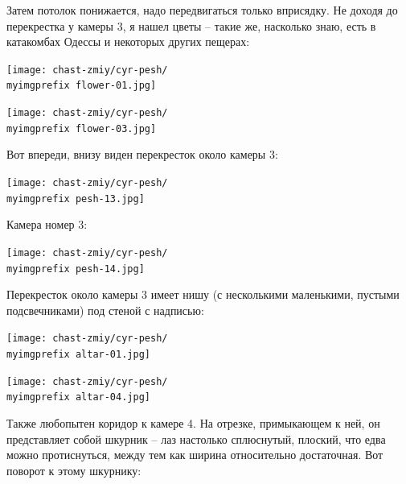 \newpage

Затем потолок понижается, надо передвигаться только вприсядку. Не доходя до перекрестка у камеры 3, я нашел цветы – такие же, насколько знаю, есть в катакомбах Одессы и некоторых других пещерах:

\begin{center}
\texttt{[image: chast-zmiy/cyr-pesh/\\myimgprefix flower-01.jpg]}
\end{center}

\begin{center}
\texttt{[image: chast-zmiy/cyr-pesh/\\myimgprefix flower-03.jpg]}
\end{center}
   
\newpage

Вот впереди, внизу виден перекресток около камеры 3:

\begin{center}
\texttt{[image: chast-zmiy/cyr-pesh/\\myimgprefix pesh-13.jpg]}
\end{center}

Камера номер 3:

\begin{center}
\texttt{[image: chast-zmiy/cyr-pesh/\\myimgprefix pesh-14.jpg]}
\end{center}

\newpage

Перекресток около камеры 3 имеет нишу (с несколькими маленькими, пустыми подсвечниками) под стеной с надписью:

\begin{center}
\texttt{[image: chast-zmiy/cyr-pesh/\\myimgprefix altar-01.jpg]}
\end{center}

\begin{center}
\texttt{[image: chast-zmiy/cyr-pesh/\\myimgprefix altar-04.jpg]}
\end{center}


\newpage

Также любопытен коридор к камере 4. На отрезке, примыкающем к ней, он представляет собой шкурник – лаз настолько сплюснутый, плоский, что едва можно протиснуться, между тем как ширина относительно достаточная. Вот поворот к этому шкурнику:


